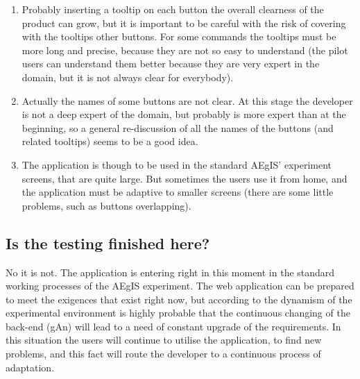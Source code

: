 \begin{enumerate}

\item 
Probably inserting a tooltip on each button the overall clearness of the product can grow, but it is important to be careful with the risk of covering with the tooltips other buttons. For some commands the tooltips must be more long and precise, because they are not so easy to understand (the pilot users can understand them better because they are very expert in the domain, but it is not always clear for everybody).  

\item
Actually the names of some buttons are not clear. At this stage the developer is not a deep expert of the domain, but probably is more expert than at the beginning, so a general re-discussion of all the names of the buttons (and related tooltips) seems to be a good idea.

\item 
The application is though to be used in the standard AEgIS' experiment screens, that are quite large. But sometimes the users use it from home, and the application must be adaptive to smaller screens (there are some little problems, such as buttons overlapping).

\end{enumerate}

\subsection{Is the testing finished here?}

No it is not. The application is entering right in this moment in the standard working processes of the AEgIS experiment. The web application can be prepared to meet the exigences that exist right now, but according to the dynamism of the experimental environment is highly probable that the continuous changing of the back-end (gAn) will lead to a need of constant upgrade of the requirements. In this situation the users will continue to utilise the application, to find new problems, and this fact will route the developer to a continuous process of adaptation.   